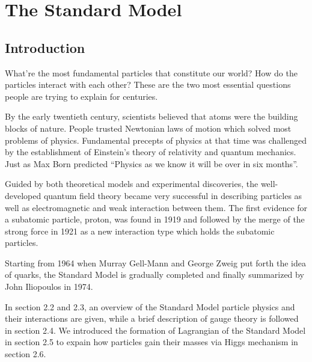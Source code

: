 \chapter{The Standard Model}

\label{ch:sm}

\section{Introduction}
\par   What're the most fundamental particles that constitute our world? How do the particles interact with each other? These are the two most essential questions people are trying to explain for centuries.

\par By the early twentieth century, scientists believed that atoms were the building blocks of nature. People trusted Newtonian laws of motion which solved most problems of physics.
Fundamental precepts of physics at that time was challenged by the establishment of Einstein's theory of relativity and quantum mechanics.
Just as Max Born predicted ``Physics as we know it will be over in six months''.

\par Guided by both theoretical models and experimental discoveries, the well-developed quantum field theory became very successful in describing particles as well as 
electromagnetic and weak interaction between them. The first evidence for a subatomic particle, proton, was found in 1919 and followed by the merge of the strong force in 1921 as a new interaction type which holds the subatomic particles. 

\par Starting from 1964 when Murray Gell-Mann and George Zweig put forth the idea of quarks, 
the Standard Model is gradually completed and finally summarized by John Iliopoulos in 1974.

\par In section 2.2 and 2.3, an overview of the Standard Model particle physics and their interactions are given, while
a brief description of gauge theory is followed in section 2.4. We introduced the formation of Lagrangian of the Standard Model in section 2.5 to expain 
how particles gain their masses via Higgs mechanism in section 2.6.

